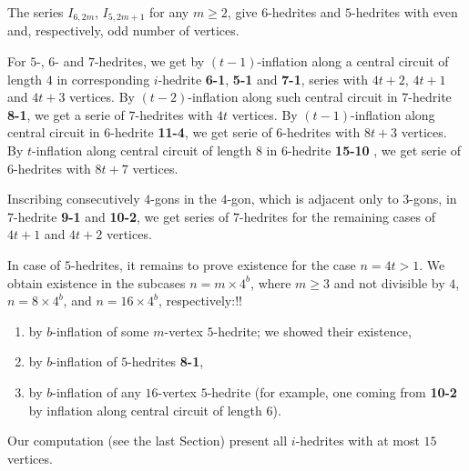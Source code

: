 \documentclass[12pt]{article}
\begin{document}
The series $I_{6,2m}$, $I_{5,2m+1}$ for any $m \ge 2$, give $6$-hedrites
and $5$-hedrites with even and, respectively, odd number of vertices.



For $5$-, $6$- and $7$-hedrites, we 
get by $(t-1)$-inflation
along a central circuit of length $4$ in corresponding
$i$-hedrite {\bf 6-1}, {\bf 5-1} and {\bf 7-1},
series with $4t+2$, $4t+1$ and $4t+3$ vertices. 
By $(t-2)$-inflation
along such central circuit in $7$-hedrite {\bf 8-1}, we get a serie of
$7$-hedrites with $4t$ vertices.
By $(t-1)$-inflation along central circuit in $6$-hedrite {\bf 11-4}, we
get serie of $6$-hedrites with $8t+3$ vertices.
By $t$-inflation along central circuit of length $8$ in 
$6$-hedrite {\bf 15-10 }, 
we get serie of $6$-hedrites with $8t+7$ vertices.




Inscribing consecutively $4$-gons in the $4$-gon, which is adjacent only to
$3$-gons, in $7$-hedrite {\bf 9-1} and {\bf 10-2}, we get series of 
$7$-hedrites for the remaining cases of $4t+1$ and $4t+2$ vertices.

In case of $5$-hedrites, it remains to prove existence for the 
case $n=4t>1$. We obtain existence in the subcases 
$n=m\times 4^b$, where $m\geq 3$ and not divisible by $4$, 
$n=8\times 4^b$, and $n=16\times 4^b$, respectively:!!
\begin{enumerate}
\item by $b$-inflation of some $m$-vertex $5$-hedrite; we showed their existence,
\item by $b$-inflation of $5$-hedrites {\bf 8-1},
\item by $b$-inflation of any $16$-vertex $5$-hedrite (for example, one coming from {\bf 10-2} by inflation along central circuit of length $6$).
\end{enumerate}





Our computation (see the last Section) present all $i$-hedrites with at most $15$ vertices. 





\end{document}
